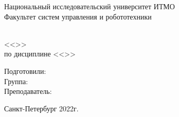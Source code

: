 \thispagestyle{empty}
\begin{center}
    Национальный исследовательский университет ИТМО\\
    Факультет систем управления и робототехники
    \vskip 7cm

    \Huge \workType                         \\
    \huge <<\workName>>                     \\
    \Large по дисциплине <<\subjectName>>   \\
\end{center}
\vfill

\begin{flushright}
    Подготовили: \authorName         \\
    Группа: \groupNumber            \\
    Преподаватель: \teacherName     \\
\end{flushright}
\vskip 2cm

\begin{center}
    Санкт-Петербург 2022г.
\end{center}
\newpage